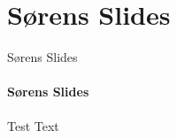 \section{Sørens Slides}
    \begin{frame}[t]{Sørens Slides}\framesubtitle{Sørens Slides}
        Test Text
    \end{frame}